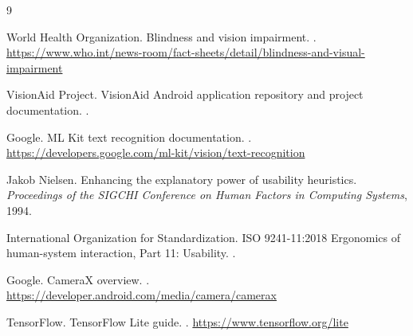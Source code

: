 \documentclass[a4paper,13pt]{report}
\begin{document}
{}
\begin{thebibliography}{9}

World Health Organization.
\newblock Blindness and vision impairment.
.
\newblock \url{https://www.who.int/news-room/fact-sheets/detail/blindness-and-visual-impairment}

VisionAid Project.
\newblock VisionAid Android application repository and project documentation.
.

Google.
\newblock ML Kit text recognition documentation.
.
\newblock \url{https://developers.google.com/ml-kit/vision/text-recognition}

Jakob Nielsen.
\newblock Enhancing the explanatory power of usability heuristics.
\newblock \textit{Proceedings of the SIGCHI Conference on Human Factors in Computing Systems}, 1994.

International Organization for Standardization.
\newblock ISO 9241-11:2018 Ergonomics of human-system interaction, Part 11: Usability.
.

Google.
\newblock CameraX overview.
.
\newblock \url{https://developer.android.com/media/camera/camerax}

TensorFlow.
\newblock TensorFlow Lite guide.
.
\newblock \url{https://www.tensorflow.org/lite}

\end{thebibliography}
\end{document}
